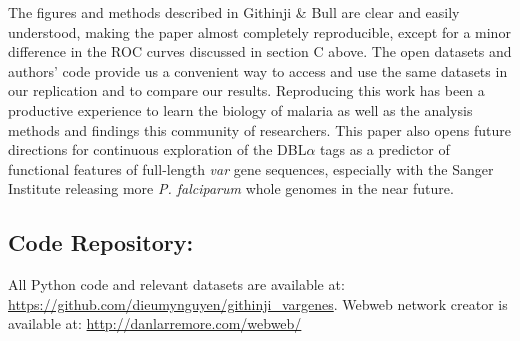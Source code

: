 \documentclass[10pt,twocolumn,superscriptaddress]{revtex4-1}
\newcommand{\var}{{\it var}\xspace}
\newcommand{\pf}{{\it P. falciparum}\xspace}
\newcommand{\dbla}{{DBL$\alpha$}\xspace}
\newcommand{\paper}{{Githinji \& Bull}\xspace}
\begin{document}
The figures and methods described in \paper are clear and easily understood, making the paper almost completely reproducible, except for a minor difference in the ROC curves discussed in section C above. The open datasets and authors' code provide us a convenient way to access and use the same datasets in our replication and to compare our results. Reproducing this work has been a productive experience to learn the biology of malaria as well as the analysis methods and findings this community of researchers. This paper also opens future directions for continuous exploration of the \dbla tags as a predictor of functional features of full-length \var gene sequences, especially with the Sanger Institute releasing more \pf whole genomes in the near future. 

\subsection*{Code Repository:}
\noindent All Python code and relevant datasets are available at: \url{https://github.com/dieumynguyen/githinji_vargenes}. Webweb network creator is available at: \url{http://danlarremore.com/webweb/}


\nocite{*}

 
\end{document}
